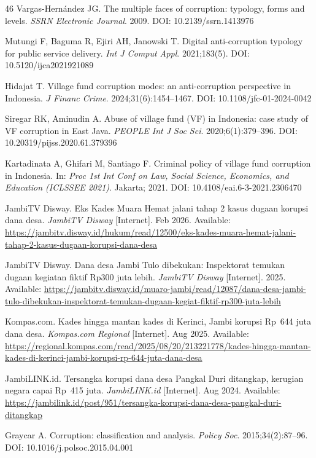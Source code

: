 \documentclass[3p,times,procedia]{elsarticle}
\begin{document}
\begin{thebibliography}{46}
Vargas-Hernández JG. The multiple faces of corruption: typology, forms and levels. \textit{SSRN Electronic Journal}. 2009. DOI: 10.2139/ssrn.1413976

Mutungi F, Baguma R, Ejiri AH, Janowski T. Digital anti-corruption typology for public service delivery. \textit{Int J Comput Appl}. 2021;183(5). DOI: 10.5120/ijca2021921089

Hidajat T. Village fund corruption modes: an anti-corruption perspective in Indonesia. \textit{J Financ Crime}. 2024;31(6):1454--1467. DOI: 10.1108/jfc-01-2024-0042

Siregar RK, Aminudin A. Abuse of village fund (VF) in Indonesia: case study of VF corruption in East Java. \textit{PEOPLE Int J Soc Sci}. 2020;6(1):379--396. DOI: 10.20319/pijss.2020.61.379396

Kartadinata A, Ghifari M, Santiago F. Criminal policy of village fund corruption in Indonesia. In: \textit{Proc 1st Int Conf on Law, Social Science, Economics, and Education (ICLSSEE 2021)}. Jakarta; 2021. DOI: 10.4108/eai.6-3-2021.2306470

JambiTV Disway. Eks Kades Muara Hemat jalani tahap 2 kasus dugaan korupsi dana desa. \textit{JambiTV Disway} [Internet]. Feb 2026. Available: \url{https://jambitv.disway.id/hukum/read/12500/eks-kades-muara-hemat-jalani-tahap-2-kasus-dugaan-korupsi-dana-desa}

JambiTV Disway. Dana desa Jambi Tulo dibekukan: Inspektorat temukan dugaan kegiatan fiktif Rp300 juta lebih. \textit{JambiTV Disway} [Internet]. 2025. Available: \url{https://jambitv.disway.id/muaro-jambi/read/12087/dana-desa-jambi-tulo-dibekukan-inspektorat-temukan-dugaan-kegiat-fiktif-rp300-juta-lebih}

Kompas.com. Kades hingga mantan kades di Kerinci, Jambi korupsi Rp~644 juta dana desa. \textit{Kompas.com Regional} [Internet]. Aug 2025. Available: \url{https://regional.kompas.com/read/2025/08/20/213221778/kades-hingga-mantan-kades-di-kerinci-jambi-korupsi-rp-644-juta-dana-desa}

JambiLINK.id. Tersangka korupsi dana desa Pangkal Duri ditangkap, kerugian negara capai Rp~415 juta. \textit{JambiLINK.id} [Internet]. Aug 2024. Available: \url{https://jambilink.id/post/951/tersangka-korupsi-dana-desa-pangkal-duri-ditangkap}

Graycar A. Corruption: classification and analysis. \textit{Policy Soc}. 2015;34(2):87--96. DOI: 10.1016/j.polsoc.2015.04.001


\end{thebibliography}
\end{document}
